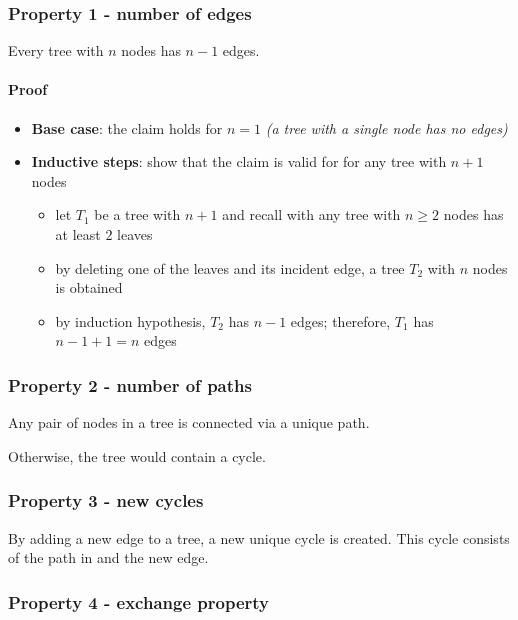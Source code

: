 \documentclass[english]{article}
\begin{document}
\subsubsection{Property 1 - number of edges}

Every tree with \(n\) nodes has \(n-1\) edges.

\paragraph{Proof}

\begin{itemize}
  \item \textbf{Base case}: the claim holds for \(n=1\) \textit{(a tree with a single node has no edges)}
  \item \textbf{Inductive steps}: show that the claim is valid for for any tree with \(n + 1\) nodes
        \begin{itemize}
          \item let \(T_1\) be a tree with \(n+1\) and recall with any tree with \(n \geq 2\) nodes has at least \(2\) leaves
          \item by deleting one of the leaves and its incident edge, a tree \(T_2\) with \(n\) nodes is obtained
          \item by induction hypothesis, \(T_2\) has \(n-1\) edges; therefore, \(T_1\) has \(n-1+1=n\) edges
        \end{itemize}
\end{itemize}

\subsubsection{Property 2 - number of paths}
\label{sec:property-2}

Any pair of nodes in a tree is connected via a unique path.

Otherwise, the tree would contain a cycle.

\subsubsection{Property 3 - new cycles}

By adding a new edge to a tree, a new unique cycle is created.
This cycle consists of the path in  and the new edge.

\subsubsection{Property 4 - exchange property}
\end{document}
